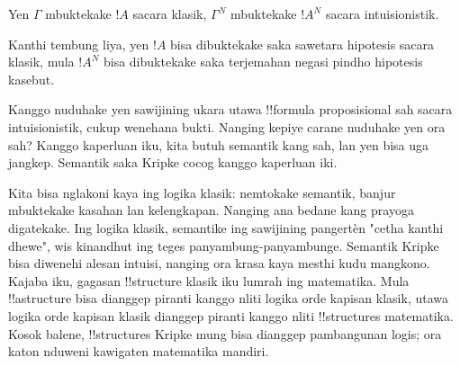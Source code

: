 \documentclass[../../../include/open-logic-section]{subfiles}
\begin{document}
\begin{thm}
Yen $\Gamma$ mbuktekake $!A$ sacara klasik,
$\Gamma^N$ mbuktekake $!A^N$
sacara intuisionistik.
\end{thm}

Kanthi tembung liya,
yen $!A$ bisa dibuktekake
saka sawetara hipotesis
sacara klasik, mula
$!A^N$ bisa dibuktekake
saka terjemahan negasi
pindho hipotesis kasebut.

Kanggo nuduhake yen sawijining
ukara utawa !!{formula}
proposisional sah sacara
intuisionistik, cukup
wenehana bukti. Nanging
kepiye carane nuduhake
yen ora sah? Kanggo
kaperluan iku, kita butuh
semantik kang sah, lan
yen bisa uga jangkep.
Semantik saka Kripke
cocog kanggo kaperluan iki.

Kita bisa nglakoni kaya
ing logika klasik:
nemtokake semantik, banjur
mbuktekake kasahan lan
kelengkapan. Nanging ana
bedane kang prayoga
digatekake. Ing logika
klasik, semantike ing
sawijining pangertèn
"cetha kanthi dhewe",
wis kinandhut ing teges
panyambung-panyambunge.
Semantik Kripke bisa
diwenehi alesan intuisi,
nanging ora krasa kaya
mesthi kudu mangkono.
Kajaba iku, gagasan
!!{structure} klasik
iku lumrah ing matematika.
Mula !!a{structure}
bisa dianggep piranti
kanggo nliti logika
orde kapisan klasik,
utawa logika orde
kapisan klasik dianggep
piranti kanggo nliti
!!{structure}s matematika.
Kosok balene,
!!{structure}s Kripke
mung bisa dianggep
pambangunan logis;
ora katon nduweni
kawigaten matematika
mandiri.
\end{document}
